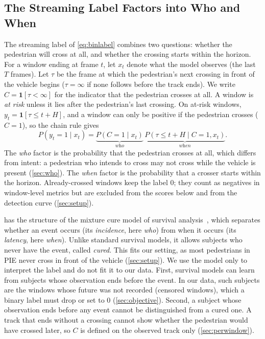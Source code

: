 \documentclass[10pt,a4paper,twocolumn]{article}
\begin{document}
\subsection{The Streaming Label Factors into Who and When}
\label{sec:factor}
The streaming label of \cref{eq:binlabel} combines two questions: whether the
pedestrian will cross at all, and whether the crossing starts within the
horizon. For a window ending at frame $t$, let $x_t$ denote what the model
observes (the last $T$ frames). Let $\tau$ be the frame at which the
pedestrian's next crossing in front of the vehicle begins ($\tau = \infty$ if
none follows before the track ends). We write $C = \mathbf{1}[\tau < \infty]$
for the indicator that the pedestrian crosses at all. A window is \emph{at
risk} unless it lies after the pedestrian's last crossing. On at-risk windows,
$y_t = \mathbf{1}[\tau \le t + H]$, and a window can only be positive if the
pedestrian crosses ($C = 1$), so the chain rule gives
\begin{equation}
  P(y_t{=}1 \mid x_t)
  = \underbrace{P(C{=}1 \mid x_t)}_{\textit{who}}
    \,
    \underbrace{P(\tau \le t{+}H \mid C{=}1, x_t)}_{\textit{when}}.
  \label{eq:factor}
\end{equation}
The \emph{who} factor is the probability that the pedestrian crosses at all,
which differs from intent: a pedestrian who intends to cross may not cross
while the vehicle is present (\cref{sec:who}). The \emph{when} factor is the
probability that a crosser starts within the horizon. Already-crossed windows
keep the label $0$; they count as negatives in window-level metrics but are
excluded from the scores below and from the detection curve
(\cref{sec:setup}).

 has the structure of the mixture cure model of survival
analysis~\cite{farewell1982cure,kuk1992mixture}, which separates whether an
event occurs (its \emph{incidence}, here \emph{who}) from when it occurs (its
\emph{latency}, here \emph{when}). Unlike standard survival models, it allows
subjects who never have the event, called \emph{cured}. This fits our setting,
as most pedestrians in PIE never cross in front of the vehicle
(\cref{sec:setup}). We use the
model only to interpret the label and do not fit it to our data. First,
survival models can learn from subjects whose observation ends before the
event. In our data, such subjects are the windows whose future was not
recorded (censored windows), which a binary label must drop or set to
$0$ (\cref{sec:objective}). Second, a subject whose observation ends before
any event cannot be distinguished from a cured one. A track that ends without
a crossing cannot show whether the pedestrian would have crossed later, so $C$
is defined on the observed track only (\cref{sec:perwindow}).
\end{document}
